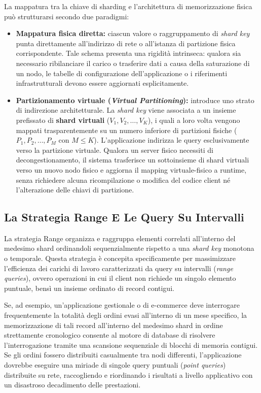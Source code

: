 \documentclass[11pt, a4paper]{article}
\begin{document}
La mappatura tra la chiave di sharding e l'architettura di memorizzazione fisica può strutturarsi secondo due paradigmi:
\begin{itemize}[noitemsep]
    \item \textbf{Mappatura fisica diretta:} ciascun valore o raggruppamento di \emph{shard key} punta direttamente all'indirizzo di rete o all'istanza di partizione fisica corrispondente. Tale schema presenta una rigidità intrinseca: qualora sia necessario ribilanciare il carico o trasferire dati a causa della saturazione di un nodo, le tabelle di configurazione dell'applicazione o i riferimenti infrastrutturali devono essere aggiornati esplicitamente.
    \item \textbf{Partizionamento virtuale (\emph{Virtual Partitioning}):} introduce uno strato di indirezione architetturale. La \emph{shard key} viene associata a un insieme prefissato di \textbf{shard virtuali} ($V_1, V_2, \dots, V_K$), i quali a loro volta vengono mappati trasparentemente su un numero inferiore di partizioni fisiche ($P_1, P_2, \dots, P_M$ con $M \le K$). L'applicazione indirizza le query esclusivamente verso la partizione virtuale. Qualora un server fisico necessiti di decongestionamento, il sistema trasferisce un sottoinsieme di shard virtuali verso un nuovo nodo fisico e aggiorna il mapping virtuale-fisico a runtime, senza richiedere alcuna ricompilazione o modifica del codice client né l'alterazione delle chiavi di partizione.
\end{itemize}

\subsection{La Strategia Range E Le Query Su Intervalli}

La strategia Range organizza e raggruppa elementi correlati all'interno del medesimo shard ordinandoli sequenzialmente rispetto a una \emph{shard key} monotona o temporale. Questa strategia è concepita specificamente per massimizzare l'efficienza dei carichi di lavoro caratterizzati da query su intervalli (\emph{range queries}), ovvero operazioni in cui il client non richiede un singolo elemento puntuale, bensì un insieme ordinato di record contigui.

Se, ad esempio, un'applicazione gestionale o di e-commerce deve interrogare frequentemente la totalità degli ordini evasi all'interno di un mese specifico, la memorizzazione di tali record all'interno del medesimo shard in ordine strettamente cronologico consente al motore di database di risolvere l'interrogazione tramite una scansione sequenziale di blocchi di memoria contigui. Se gli ordini fossero distribuiti casualmente tra nodi differenti, l'applicazione dovrebbe eseguire una miriade di singole query puntuali (\emph{point queries}) distribuite su rete, raccogliendo e riordinando i risultati a livello applicativo con un disastroso decadimento delle prestazioni.
\end{document}
